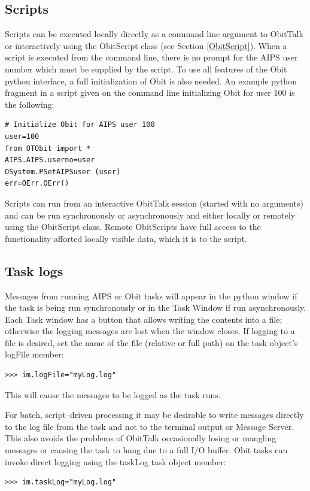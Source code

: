 \documentclass[11pt]{report}
\begin{document}
\subsection{Scripts}
Scripts can be executed locally directly as a command line argument to
ObitTalk or interactively using the ObitScript class (see Section
\ref{ObitScript}). 
When a script is executed from the command line, there is no prompt for
the AIPS user number which must be supplied by the script.
To use all features of the Obit python interface, a full
initialization of Obit is also needed.
An example python fragment in a script given on the command line
initializing Obit for user 100 is the following:
\begin{verbatim}
# Initialize Obit for AIPS user 100
user=100
from OTObit import *
AIPS.AIPS.userno=user
OSystem.PSetAIPSuser (user) 
err=OErr.OErr()
\end{verbatim}

Scripts can run from an interactive ObitTalk session (started with no
arguments) and can be run synchronously or asynchronously and either
locally or remotely using the ObitScript class.
Remote ObitScripts have full access to the functionality afforted
locally visible data, which it is to the script.


\subsection{Task logs}
Messages from running AIPS or Obit tasks will appear in the python
window if the task is being run synchronously or in the Task Window
if run asynchronously.
Each Task window has a button that allows writing the contents into a
file; otherwise the logging messages are lost when the window closes.
If logging to a file is desired, set the name of the file (relative or
full path) on the task object's logFile member:
\begin{verbatim}
>>> im.logFile="myLog.log"
\end{verbatim}
This will cause the messages to be logged as the task runs.

For batch, script--driven processing it may be desirable to write
messages directly to the log file from the task and not to the
terminal output or Message Server. 
This also avoids the problems of ObitTalk occasionally losing or
mangling messages or causing the task to hang due to a full I/O
buffer. 
Obit tasks can invoke direct logging using the taskLog task object
member: 
\begin{verbatim}
>>> im.taskLog="myLog.log"
\end{verbatim}
\end{document}
